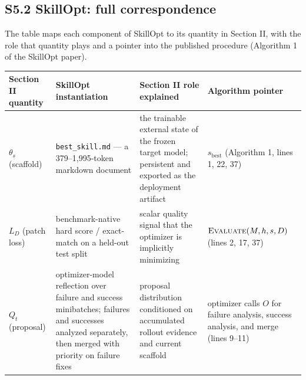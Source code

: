 \documentclass[
]{article}
\newcounter{none} %
\begin{document}
\subsection{S5.2 SkillOpt: full
correspondence}\label{s5.2-skillopt-full-correspondence}

The table maps each component of SkillOpt to its quantity in Section II,
with the role that quantity plays and a pointer into the published
procedure (Algorithm 1 of the SkillOpt paper).

{\def\LTcaptype{none} %
\begin{longtable}[]{@{}
  >{\raggedright\arraybackslash}p{}
  >{\raggedright\arraybackslash}p{}
  >{\raggedright\arraybackslash}p{}
  >{\raggedright\arraybackslash}p{}@{}}
\toprule\noalign{}
\begin{minipage}[b]{\linewidth}\raggedright
Section II quantity
\end{minipage} & \begin{minipage}[b]{\linewidth}\raggedright
SkillOpt instantiation
\end{minipage} & \begin{minipage}[b]{\linewidth}\raggedright
Section II role explained
\end{minipage} & \begin{minipage}[b]{\linewidth}\raggedright
Algorithm pointer
\end{minipage} \\
\midrule\noalign{}
\endhead
\bottomrule\noalign{}
\endlastfoot
\(\theta_s\) (scaffold) & \texttt{best\_skill.md} --- a 379--1,995-token
markdown document & the trainable external state of the frozen target
model; persistent and exported as the deployment artifact &
\(s_{\text{best}}\) (Algorithm 1, lines 1, 22, 37) \\
\(L_D\) (patch loss) & benchmark-native hard score / exact-match on a
held-out test split & scalar quality signal that the optimizer is
implicitly minimizing & \(\textsc{Evaluate}(M, h, s, D)\) (lines 2, 17,
37) \\
\(Q_t\) (proposal) & optimizer-model reflection over failure and success
minibatches; failures and successes analyzed separately, then merged
with priority on failure fixes & proposal distribution conditioned on
accumulated rollout evidence and current scaffold & optimizer calls
\(O\) for failure analysis, success analysis, and merge (lines 9--11) \\

\end{longtable}}
\end{document}
